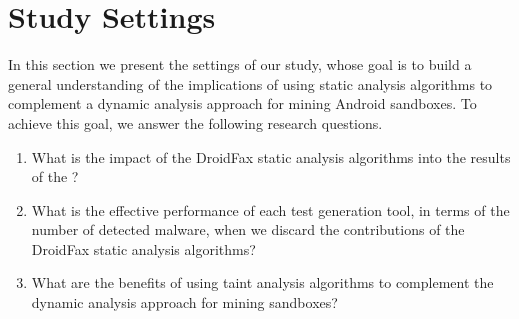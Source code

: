 \section{Study Settings}



In this section
we present the settings of our study, whose goal is to build a general understanding of the implications of using static analysis algorithms
to complement a dynamic analysis approach
for mining Android sandboxes. %
To achieve this goal, we answer the following research questions.

\begin{enumerate}[(RQ1)]
 
 \item What is the impact of the DroidFax static analysis algorithms into the results of the \blls?
  
 \item What is the effective performance of each test generation tool, in terms of the number of detected malware, when we
   discard the contributions of the DroidFax static analysis algorithms?

 \item What are the benefits of using taint
 analysis algorithms to complement the dynamic analysis approach for mining sandboxes?
\end{enumerate}


